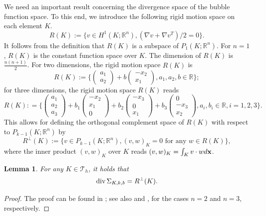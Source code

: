 \documentclass{amsart}
\newtheorem{lemma}{Lemma}[section]
\def\a#1{\begin{align*}#1\end{align*}} \def\an#1{\begin{align}#1\end{align}}
\numberwithin{table}{section}
\numberwithin{figure}{section}
\begin{document}
We need  an important result concerning the divergence space of the bubble function space.
 To this end, we introduce the following rigid motion space on each element $K$.
  \begin{equation}\label{R}
  R(K):=\{ v\in H^1(K; \mathbb{R}^n), (\nabla v+\nabla v^T)/2=0\}.
  \end{equation}
It follows from the definition that  $R(K)$ is a subspace of $P_1(K;  \mathbb{R}^n)$.
For $n=1$, $R(K)$ is the constant function space over $K$. The dimension of $R(K)$ is $\frac{n(n+1)}{2}$.
For two dimensions, the rigid motion space $R(K)$ is
\begin{equation}\label{2Drigid}
R(K):=\bigg\{\begin{pmatrix} a_1 \\a_2 \end{pmatrix}+ b\begin{pmatrix}-x_2\\ x_1\end{pmatrix}, a_1, a_2, b\in \mathbb{R}\bigg\};
\end{equation}
for three dimensions, the rigid motion space $R(K)$ reads
\begin{equation}\label{3Drigid}
R(K): =\bigg\{\begin{pmatrix} a_1 \\a_2  \\ a_3\end{pmatrix}+ b_1\begin{pmatrix}-x_2\\ x_1\\0\end{pmatrix}+b_2\begin{pmatrix}-x_3\\ 0\\x_1\end{pmatrix}+b_3\begin{pmatrix}0\\ -x_3\\x_2\end{pmatrix}, a_i, b_i\in \mathbb{R},  i=1,2,3 \bigg\}.
\end{equation}
This allows for defining the orthogonal complement  space of  $R(K)$ with  respect to $P_{k-1}(K; \mathbb{R}^n)$ by
 \begin{equation}
 R^\perp(K):=\{v\in P_{k-1}(K; \mathbb{R}^n), (v, w)_K=0\text{ for any }w\in R(K)\},
 \end{equation}
 where the inner product $(v, w)_K$ over $K$ reads $(v, w)_K=\int_K v\cdot w d\mathbf{x}$.
\begin{lemma}\label{lemma2.3} For any $K\in\mathcal{T}_h$, it holds that
\begin{equation}
\operatorname{div} \Sigma_{K, k, b}=R^\perp(K).
\end{equation}
\end{lemma}
\begin{proof} The proof can be found in \cite{Hu2014}; see also \cite{Hu-Zhang2014a} and
 \cite{Hu-Zhang2014b}, for the cases $n=2$ and $n=3$, respectively.
\end{proof}
\end{document}
